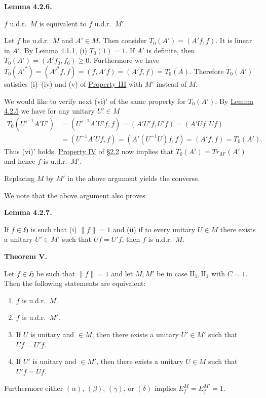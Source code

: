\documentclass[twoside,leqno]{article}
\newcommand{\Tr}{Tr}
\newcommand{\cH}{\mathfrak{H}}
\newcommand{\SectionRef}[1]{\hyperlink{sec:#1}{\S#1}}
\newcommand{\StatementTarget}[1]{\phantomsection\hypertarget{stmt:#1}{}}
\newcommand{\StatementRef}[2]{\hyperlink{stmt:#1}{#2}}
\newenvironment{statement}[2]{%
  \par\medskip
  \noindent\StatementTarget{#1}\hspace*{\parindent}\textbf{#2.}\ \itshape\ignorespaces
}{\par}
\begin{document}
\begin{statement}{lem:4.2.6}{Lemma 4.2.6}
\(f\) u.d.r.\ \(M\) is equivalent to \(f\) u.d.r.\ \(M'\).
\end{statement}

Let \(f\) be u.d.r.\ \(M\) and \(A'\in M\). Then consider
$T_0(A')=(A'f,f)$.
It is linear in \(A'\). By \StatementRef{lemma:4.1.1}{Lemma 4.1.1}, (i) \(T_0(1)=1\). If \(A'\) is
definite, then \(T_0(A')=(A'f_0,f_0)\geq0\). Furthermore we have
$
 T_0(A'^*)=(A'^*f,f)=(f,A'f)
 =\overline{(A'f,f)}
 =\overline{T_0(A)}.
$
Therefore \(T_0(A')\) satisfies (i)--(iv) and (v) of
\StatementRef{property:III}{Property III} with
\(M'\) instead of \(M\).

We would like to verify next (vi)\('\) of the same property for \(T_0(A')\).
By \StatementRef{lem:4.2.5}{Lemma 4.2.5} we have for any unitary
\(U'\in M\)
\begin{align*}
 T_0(U'^{-1}A'U')
  &=(U'^{-1}A'U'f,f)=(A'U'f,U'f)=(A'Uf,Uf)\\
  &=(U^{-1}A'Uf,f)=(A'(U^{-1}U)f,f)=(A'f,f)=T_0(A').
\end{align*}
Thus (vi)\('\) holds. \StatementRef{property:IV}{Property IV} of
\SectionRef{2.2} now implies that
\(T_0(A')=\Tr_{M'}(A')\) and hence \(f\) is u.d.r.\ \(M'\).

Replacing \(M\) by \(M'\) in the above argument yields the converse.

We note that the above argument also proves

\begin{statement}{lem:4.2.7}{Lemma 4.2.7}
If \(f\in\cH\) is such that (i) \(\lVert f\rVert=1\) and (ii) if to every
unitary \(U\in M\) there exists a unitary \(U'\in M'\) such that \(Uf=U'f\),
then \(f\) is u.d.r.\ \(M\).
\end{statement}

\begin{statement}{thm:V}{Theorem V}
Let \(f\in\cH\) be such that \(\lVert f\rVert=1\) and let \(M,M'\) be in
case \(\mathrm{II}_1,\mathrm{II}_1\) with \(C=1\). Then the following
statements are equivalent:
\begin{enumerate}[label={},leftmargin=2.4em]
\item[\((\alpha)\)] \(f\) is u.d.r.\ \(M\).
\item[\((\beta)\)] \(f\) is u.d.r.\ \(M'\).
\item[\((\gamma)\)] If \(U\) is unitary and \(\in M\), then there exists a unitary
      \(U'\in M'\) such that \(Uf=U'f\).
\item[\((\delta)\)] If \(U'\) is unitary and \(\in M'\), then there exists a unitary
      \(U\in M\) such that \(U'f=Uf\).
\end{enumerate}

Furthermore either \((\alpha)\), \((\beta)\), \((\gamma)\), or
\((\delta)\) implies \(E_f^M=E_f^{M'}=1\).
\end{statement}
\end{document}
